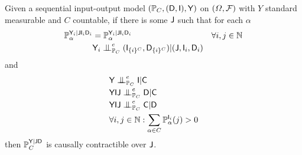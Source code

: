 \begin{theorem}\label{th:ind}
Given a sequential input-output model $(\mathbb{P}_C,(\mathsf{D},\mathsf{I}),\mathsf{Y})$ on $(\Omega,\mathcal{F})$ with $Y$ standard measurable and $C$ countable, if there is some $\mathsf{J}$ such that for each $\alpha$
\begin{align}
    \prob{P}_\alpha^{\RV{Y}_i|\RV{J}\RV{I}_i\RV{D}_i} &= \prob{P}_\alpha^{\RV{Y}_i|\RV{J}\RV{I}_i\RV{D}_i} &\forall i,j\in \mathbb{N}\\
    &\RV{Y}_i\CI^e_{\prob{P}_C} (\RV{I}_{\{i\}^C},\RV{D}_{\{i\}^C})|(\RV{J},\RV{I}_i,\RV{D}_i)
\end{align}
and
\begin{align}
    &\RV{Y}\CI^e_{\prob{P}_C} \RV{I} | \RV{C}\\
    &\RV{YIJ}\CI^e_{\prob{P}_C} \RV{D}|\RV{C}\\
    &\RV{YIJ}\CI^e_{\prob{P}_C} \RV{C}|\RV{D}\\
    &\forall i,j\in \mathbb{N}: \sum_{\alpha\in C} \prob{P}_\alpha^{\RV{I}_i}(j)>0
\end{align}
then $\mathbb{P}_C^{\mathsf{Y}|\mathsf{JD}}$ is causally contractible over $\mathsf{J}$.
\end{theorem}

